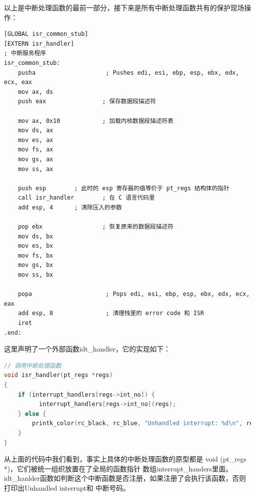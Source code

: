 \par 以上是中断处理函数的最前一部分，接下来是所有中断处理函数共有的保护现场操作：
\begin{lstlisting}[language = {[x86masm]Assembler}, caption = idt/idt\_s.s]
[GLOBAL isr_common_stub]
[EXTERN isr_handler]
; 中断服务程序
isr_common_stub:
	pusha                    ; Pushes edi, esi, ebp, esp, ebx, edx, ecx, eax
	mov ax, ds
	push eax                ; 保存数据段描述符
	
	mov ax, 0x10            ; 加载内核数据段描述符表
	mov ds, ax
	mov es, ax
	mov fs, ax
	mov gs, ax
	mov ss, ax
	
	push esp		; 此时的 esp 寄存器的值等价于 pt_regs 结构体的指针
	call isr_handler        ; 在 C 语言代码里
	add esp, 4 		; 清除压入的参数
	
	pop ebx                 ; 恢复原来的数据段描述符
	mov ds, bx
	mov es, bx
	mov fs, bx
	mov gs, bx
	mov ss, bx
	
	popa                     ; Pops edi, esi, ebp, esp, ebx, edx, ecx, eax
	add esp, 8               ; 清理栈里的 error code 和 ISR
	iret
.end:
\end{lstlisting}

\par 这里声明了一个外部函数idt\_handler，它的实现如下：
\begin{lstlisting}[language = C, caption = idt/idt.c]
// 调用中断处理函数
void isr_handler(pt_regs *regs)
{
	if (interrupt_handlers[regs->int_no]) {
	      interrupt_handlers[regs->int_no](regs);
	} else {
		printk_color(rc_black, rc_blue, "Unhandled interrupt: %d\n", regs->int_no);
	}
}
\end{lstlisting}

\par 从上面的代码中我们看到，事实上具体的中断处理函数的原型都是 void (pt\_regs *)，它们被统一组织放置在了全局的函数指针\allowbreak
数组interrupt\_handers里面。idt\_hanlder函数如判断这个中断函数是否注册，如果注册了会执行该函数，否则打印出Unhandled interrupt和\allowbreak
中断号码。

